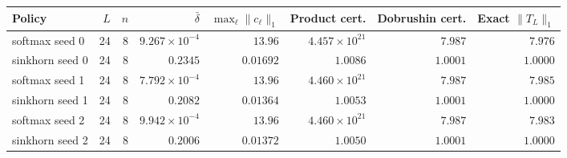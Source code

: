 \begin{center}
\centering
\small
\begin{tabular}{lrrrrrrr}
\toprule
Policy & \(L\) & \(n\) & \(\bar\delta\) & \(\max_\ell\|c_\ell\|_1\) & Product cert. & Dobrushin cert. & Exact \(\|T_L\|_1\) \\
\midrule
softmax seed 0 & 24 & 8 & \(9.267\times 10^{-4}\) & \(13.96\) & \(4.457\times 10^{21}\) & \(7.987\) & \(7.976\) \\
sinkhorn seed 0 & 24 & 8 & \(0.2345\) & \(0.01692\) & \(1.0086\) & \(1.0001\) & \(1.0000\) \\
softmax seed 1 & 24 & 8 & \(7.792\times 10^{-4}\) & \(13.96\) & \(4.460\times 10^{21}\) & \(7.987\) & \(7.985\) \\
sinkhorn seed 1 & 24 & 8 & \(0.2082\) & \(0.01364\) & \(1.0053\) & \(1.0001\) & \(1.0000\) \\
softmax seed 2 & 24 & 8 & \(9.942\times 10^{-4}\) & \(13.96\) & \(4.460\times 10^{21}\) & \(7.987\) & \(7.983\) \\
sinkhorn seed 2 & 24 & 8 & \(0.2006\) & \(0.01372\) & \(1.0050\) & \(1.0001\) & \(1.0000\) \\
\bottomrule
\end{tabular}
\label{tab:dobrushin-diagnostic}
\end{center}
